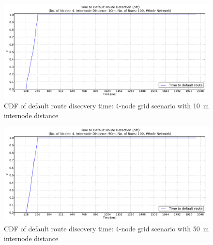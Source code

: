 \begin{figure}[h]
  \begin{center}
  \vspace{-10pt}
    \leavevmode
      \includegraphics[scale=0.38]
      {Pics/results/4/MRHOF/grid/dist10_montecarlo_cdf_hist.pdf}
   \caption{CDF of default route discovery time: 4-node grid scenario with 10~m internode distance}
   \label{fig:4_MRHOF_grid_10_cdf}
  \end{center}
\end{figure}

\begin{figure}[htpb]
  \begin{center}
  \vspace{-20pt}
    \leavevmode
      \includegraphics[scale=0.38]
      {Pics/results/4/MRHOF/grid/dist50_montecarlo_cdf_hist.pdf}
   \caption{CDF of default route discovery time: 4-node grid scenario with 50~m internode distance}
   \label{fig:4_MRHOF_grid_50_cdf}
  \end{center}
\end{figure}

